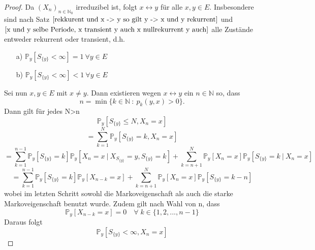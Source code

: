 \documentclass[a4paper,12pt]{scrartcl}
\theoremstyle{definition}
\begin{document}
\begin{proof}
Da $(X_{n})_{n \in \mathbb{N}_{0}}$ irreduzibel ist, folgt $x \leftrightarrow y$ für alle $x,y \in E$. Insbesondere sind nach Satz $\ref{rekkurent und x -> y so gilt y -> x und y rekurrent}$ und $\ref{x und y selbe Periode, x transient y auch x nullrekurrent y auch}$ alle Zustände entweder rekurrent oder transient, d.h.
\begin{itemize}
\item[a)] $\mathbb{P}_{y}[S_{\lbrace y \rbrace} < \infty] = 1 \: \forall y \in E$
\item[b)] $\mathbb{P}_{y}[S_{\lbrace y \rbrace} < \infty] < 1 \: \forall y \in E$
\end{itemize}
Sei nun $x,y \in E$ mit $x \neq y$. Dann existieren wegen $x \leftrightarrow y$ ein $n \in \mathbb{N}$ so, dass
\begin{equation*}
n = \min \lbrace k \in \mathbb{N} \: : \: p_{k}(y,x)>0 \rbrace.
\end{equation*}
Dann gilt für jedes N>n
\begin{equation*}
\mathbb{P}_{y}[S_{\lbrace y \rbrace} \leq N, X_{n} = x]
\end{equation*}
\begin{equation*}
= \sum_{k=1}^{N} \mathbb{P}_{y}[S_{\lbrace y \rbrace} = k, X_{n} = x]
\end{equation*}
\begin{equation*}
= \sum_{k=1}^{n-1} \mathbb{P}_{y}[S_{\lbrace y \rbrace} = k]\mathbb{P}_{y}[X_{n} = x \: | \: X_{S_{\lbrace y \rbrace}} = y, S_{\lbrace y \rbrace} = k] + \sum_{k=n+1}^{N} \mathbb{P}_{y}[X_{n} =x]\mathbb{P}_{y}[S_{\lbrace y \rbrace} = k \: | \: X_{n} = x]
\end{equation*}
\begin{equation*}
= \sum_{k=1}^{n-1} \mathbb{P}_{y}[S_{\lbrace y \rbrace} = k]\mathbb{P}_{y}[X_{n-k} = x] + \sum_{k=n+1}^{N} \mathbb{P}_{y}[X_{n} =x]\mathbb{P}_{y}[S_{\lbrace y \rbrace} = k-n]
\end{equation*}
wobei im letzten Schritt sowohl die Markoveigenschaft als auch die starke Markoveigenschaft benutzt wurde. Zudem gilt nach Wahl von n, dass
\begin{equation*}
\mathbb{P}_{y}[X_{n-k} = x] = 0 \quad \forall \; k \in \lbrace 1,2,...,n-1 \rbrace
\end{equation*}
Daraus folgt
\begin{equation*}
\mathbb{P}_{y}[S_{\lbrace y \rbrace} < \infty, X_{n} = x]
\end{equation*}
\begin{equation*}

\end{equation*}
\end{proof}
\end{document}
